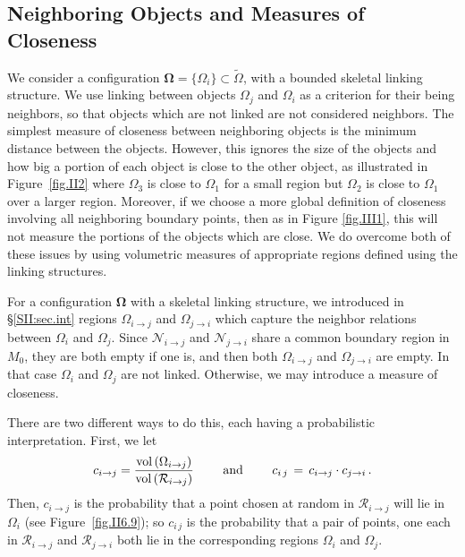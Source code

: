 \documentclass[10pt]{amsart}
\theoremstyle{definition}
\theoremstyle{definition}
\numberwithin{equation}{section}
\newcommand{\vol}{{\rm vol}\,}
\def \bgW {\boldsymbol \Omega}
\def \cN {\mathcal{N}}
\def \cR {\mathcal{R}}
\def \gW {\Omega}
\begin{document}
\subsection*{Neighboring Objects and Measures of Closeness} 
\par
We consider a configuration $\bgW = \{\gW_i\} \subset \tilde \gW$, with 
a bounded skeletal linking structure.  We use linking between objects 
$\gW_j$ and $\gW_i$ as a criterion for their being neighbors, so that 
objects which are not linked are not considered neighbors.  The simplest 
measure of closeness between neighboring objects is the minimum 
distance between the objects.  However, this ignores the size of the 
objects and how big a portion of each object is close to the other object, 
as illustrated in Figure~\ref{fig.II2} where $\gW_3$ is close to $\gW_1$ 
for a small region but $\gW_2$ is close to $\gW_1$ over a larger region.  
Moreover, if we choose a more global definition of closeness involving all 
neighboring boundary points, then as in Figure \ref{fig.III1}, this will not 
measure the portions of the objects which are close.  
We do overcome both of these issues by using volumetric measures of 
appropriate regions defined using the linking structures. 
\par
For a configuration $\bgW$ with a skeletal linking structure, we 
introduced in \S \ref{SII:sec.int} regions $\gW_{i \to j}$ and $\gW_{j \to 
i}$ which capture the neighbor relations between $\gW_i$ and $\gW_j$.  
Since $\cN_{i \to j}$ and $\cN_{j \to i}$ share a common boundary region 
in $M_0$, they are both empty if one is, and then both $\gW_{i \to j}$ and 
$\gW_{j \to i}$ are empty.  In that case $\gW_i$ and $\gW_j$ are not 
linked.  Otherwise, we may introduce a measure of closeness.  \par
 There are two different ways to do this, each having a probabilistic 
interpretation.  First, we let 
$$ c_{i \to j} = \frac{\vol(\gW_{i \to j})}{\vol(\cR_{i \to j})}\qquad \text{ 
and } \qquad c_{i\, j} \, = \, c_{i \to j}\cdot c_{j \to i}\, .$$  
Then, $c_{i \to j}$ is the probability that a point chosen at random in 
$\cR_{i \to j}$ will lie in $\gW_i$ (see Figure~\ref{fig.II6.9}); so $c_{i\, 
j}$ is the probability that a pair of points, one each in $\cR_{i \to j}$ and 
$\cR_{j \to i}$ both lie in the corresponding regions $\gW_i$ and $\gW_j$.  
\par 
\end{document}

